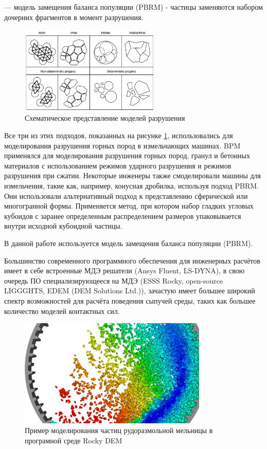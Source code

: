\documentclass[utf8x, 14pt, oneside, a4paper]{article}
\begin{document}
--- модель замещения баланса популяции (PBRM) - частицы заменяются набором дочерних фрагментов в момент разрушения.
\begin{figure}[H]
	\centering
	\includegraphics[width=0.6\textwidth]{break_model}
	\caption{Схематическое представление моделей разрушения \cite{another_hard}}
	\label{pic:break_model}
\end{figure} 
Все три из этих подходов, показанных на рисунке \ref{pic:break_model}, использовались для моделирования разрушения горных пород в измельчающих машинах. 
BPM применялся для моделирования разрушения горных пород, гранул и бетонных материалов с использованием режимов ударного разрушения и режимов разрушения при сжатии.
Некоторые инженеры \cite{another_hard} также смоделировали машины для измельчения, такие как, например, конусная дробилка, используя подход PBRM. 
Они использовали альтернативный подход к представлению сферической или многогранной формы. 
Применяется метод, при котором набор гладких угловых кубоидов с заранее определенным распределением размеров упаковывается внутри исходной кубоидной частицы.

В данной работе используется модель замещения баланса популяции (PBRM).

Большинство современного программного обеспечения для инженерных расчётов имеет в себе встроенные МДЭ решатели (Ansys Fluent, LS-DYNA), в свою очередь ПО специализирующееся на МДЭ (ESSS Rocky, open-source LIGGGHTS, EDEM (DEM Solutions Ltd.)), зачастую имеет большее широкий спектр возможностей для расчёта поведения сыпучей среды, таких как большее количество моделей контактных сил.

\begin{figure}[H]
	\centering
	\includegraphics[width=0.8\textwidth]{rocky_dem_j}
	\caption{Пример моделирования частиц рудоразмольной мельницы в програмной среде Rocky DEM}
	\label{pic:rocky}
\end{figure} 
\end{document}
